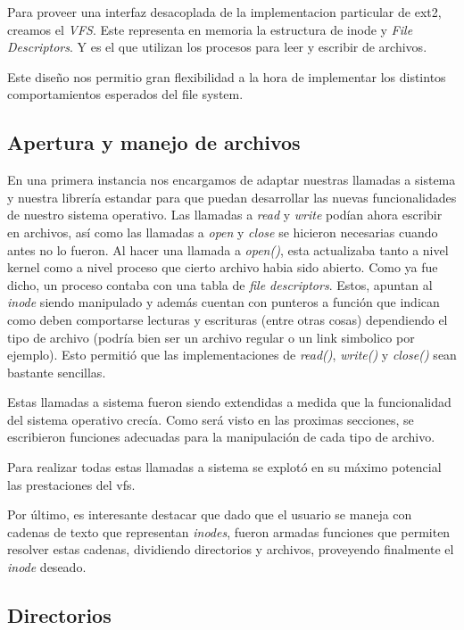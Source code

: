 \documentclass[a4paper,10pt]{article}
\begin{document}
Para proveer una interfaz desacoplada de la implementacion particular de ext2, creamos el \textit{VFS}.
Este representa en memoria la estructura de inode y \textit{File Descriptors}.
Y es el que utilizan los procesos para leer y escribir de archivos.

Este diseño nos permitio gran flexibilidad a la hora de implementar los distintos comportamientos esperados del file system.

\subsection{Apertura y manejo de archivos}
En una primera instancia nos encargamos de adaptar nuestras llamadas a sistema y nuestra librería estandar
para que puedan desarrollar las nuevas funcionalidades de nuestro sistema operativo.
Las llamadas a \textit{read} y \textit{write} podían ahora escribir en archivos, así como las llamadas a \textit{open} y \textit{close} se hicieron
necesarias cuando antes no lo fueron.
Al hacer una llamada a \textit{open()}, esta actualizaba tanto a nivel kernel como a nivel proceso que cierto archivo habia sido abierto. 
Como ya fue dicho, un proceso contaba con una tabla de \textit{file descriptors}. 
Estos, apuntan al \textit{inode} siendo manipulado y además cuentan con punteros a función que indican como deben comportarse lecturas y escrituras (entre otras cosas) dependiendo el tipo de archivo 
(podría bien ser un archivo regular o un link simbolico por ejemplo). 
Esto permitió que las implementaciones de \textit{read()}, \textit{write()} y \textit{close()} sean bastante sencillas. 
    
Estas llamadas a sistema fueron siendo extendidas a medida que la funcionalidad del sistema operativo crecía. Como
será visto en las proximas secciones, se escribieron funciones adecuadas para la manipulación de cada tipo de archivo.

Para realizar todas estas llamadas a sistema se explotó en su máximo potencial las prestaciones del vfs.

Por último, es interesante destacar que dado que el usuario se maneja con cadenas de texto que representan 
\textit{inodes}, fueron armadas funciones que permiten resolver estas cadenas, dividiendo directorios y archivos,
proveyendo finalmente el \textit{inode} deseado. 

\subsection{Directorios}
\end{document}
